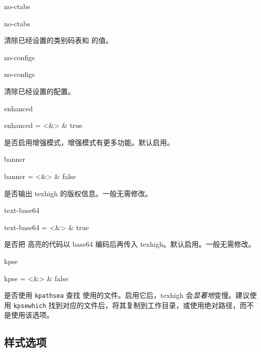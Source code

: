 \documentclass[class=article,openany]{cusdoc}[2025/10/10]
\begin{document}
\begin{keyval}[path=high]{no-ctabs}
  \begin{syntax}
    no-ctabs
  \end{syntax}
清除已经设置的类别码表和  的值。
\end{keyval}

\begin{keyval}[path=high]{no-configs}
  \begin{syntax}
    no-configs
  \end{syntax}
清除已经设置的配置。
\end{keyval}

\begin{keyval}[path=high]{enhanced}
  \begin{syntax}
    enhanced = <&\TTF> & true
  \end{syntax}
是否启用增强模式，增强模式有更多功能。默认启用。
\end{keyval}

\begin{keyval}[path=high]{banner}
  \begin{syntax}
    banner = <&\TTF> & false
  \end{syntax}
是否输出 texhigh 的版权信息。一般无需修改。
\end{keyval}

\begin{keyval}[path=high]{text-base64}
  \begin{syntax}
    text-base64 = <&\TTF> & true
  \end{syntax}
是否把  高亮的代码以 base64 编码后再传入 texhigh。默认启用。一般无需修改。
\end{keyval}

\begin{keyval}[path=high]{kpse}
  \begin{syntax}
    kpse = <&\TTF> & false
  \end{syntax}
是否使用 \texttt{kpathsea} 查找  使用的文件。启用它后，texhigh 会\emph{显著地}变慢。建议使用 \texttt{kpsewhich} 找到对应的文件后，将其复制到工作目录，或使用绝对路径，而不是使用该选项。
\end{keyval}

\subsection{样式选项}
\end{document}
